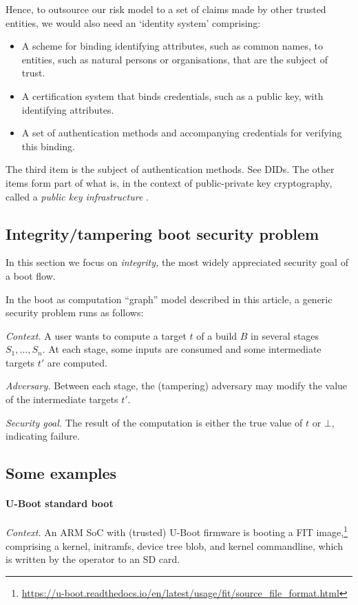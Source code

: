 Hence, to outsource our risk model to a set of claims made by other trusted entities, we would also need an `identity system' comprising:
\begin{itemize}
  \item A scheme for binding identifying attributes, such as common names, to entities, such as natural persons or organisations, that are the subject of trust.
  \item A certification system that binds credentials, such as a public key, with identifying attributes.
  \item A set of authentication methods and accompanying credentials for verifying this binding. 
\end{itemize}
The third item is the subject of authentication methods. See DIDs.
%
The other items form part of what is, in the context of public-private key cryptography, called a \emph{public key infrastructure} \cite{rfc5280}.

\subsection{Integrity/tampering boot security problem}

In this section we focus on \emph{integrity,} the most widely
appreciated security goal of a boot flow.

In the boot as computation ``graph'' model described in this article, a
generic security problem runs as follows:

\emph{Context.} A user wants to compute a target \(t\) of a build \(B\)
in several stages \(S_1,\ldots,S_n\). At each stage, some inputs are
consumed and some intermediate targets \(t'\) are computed.

\emph{Adversary.} Between each stage, the (tampering) adversary may
modify the value of the intermediate targets \(t'\).

\emph{Security goal.} The result of the computation is either the true
value of \(t\) or \(\bot\), indicating failure.


\subsection{Some examples}

\paragraph{U-Boot standard boot}

\emph{Context.} An ARM SoC with (trusted) U-Boot firmware is booting a FIT
image,\footnote{\url{https://u-boot.readthedocs.io/en/latest/usage/fit/source_file_format.html}} comprising a kernel, initramfs, device tree blob, and kernel
commandline, which is written by the operator to an SD card.

